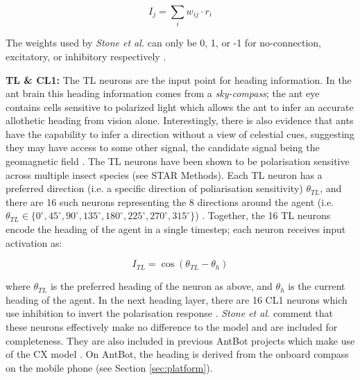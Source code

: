 \documentclass[a4paper,11pt,twoside,openright]{article}
\begin{document}
\begin{equation}
  I_j = \sum_{i} w_{ij} \cdot r_i
\end{equation}

The weights used by \textit{Stone et al.} can only be 0, 1, or -1 for
no-connection, excitatory, or inhibitory respectively \cite{Stone2017}.
\newline
\par

\textbf{TL \& CL1:}
The TL neurons are the input point for heading information. In the ant brain
this heading information comes from a \textit{sky-compass}; the ant eye contains
cells sensitive to polarized light which allows the ant to infer an accurate
allothetic heading from vision alone. Interestingly, there is also evidence that ants
have the capability to infer a direction without a view of celestial cues,
suggesting they may have access to some other signal, the candidate signal being
the geomagnetic field \cite{Fleischmann2018, Grob2017}. The TL neurons have been
shown to be polarisation sensitive across multiple insect species \cite{Stone2017}
(see STAR Methods). Each TL neuron has a preferred direction (i.e. a specific
direction of poliarisation sensitivity) $\theta_{TL} $, and there are 16 such
neurons representing the 8 directions around the agent (i.e.
$\theta_{TL} \in \{ 0^{\circ}, 45^{\circ}, 90^{\circ}, 135^{\circ}, 180^{\circ},
225^{\circ}, 270^{\circ}, 315^{\circ}\} $) \cite{Stone2017}. Together, the 16
TL neurons encode the heading of the agent in a single timestep; each neuron
receives input activation as:

\begin{equation}
  I_{TL} = \cos ( \theta_{TL} - \theta_{h} )
\end{equation}

where $\theta_{TL} $ is the preferred heading of the neuron as above, and
$\theta_{h} $ is the current heading of the agent. In the next heading layer,
there are 16 CL1 neurons which use inhibition to invert the polarisation
response \cite{Stone2017}. \textit{Stone et al.} comment that these neurons
effectively make no difference to the model and are included for completeness.
They are also included in previous AntBot projects which make use of the CX model
\cite{Zhang2017, Scimeca2017}. On AntBot, the heading is derived from the onboard
compass on the mobile phone (see Section \ref{sec:platform}).
\newline
\par
\end{document}
